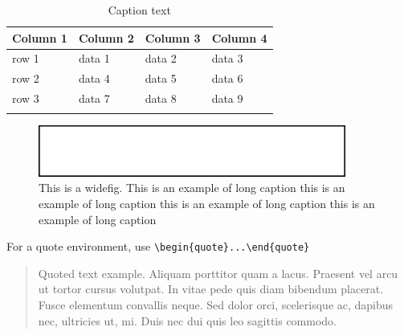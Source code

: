 \documentclass[sn-mathphys,Numbered]{sn-jnl}%
\theoremstyle{thmstyleone}%
\theoremstyle{thmstyletwo}%
\theoremstyle{thmstylethree}%
\begin{document}
\begin{table}[h]
\caption{Caption text}\label{tab1}%
\begin{tabular}{@{}llll@{}}
\toprule
Column 1 & Column 2  & Column 3 & Column 4\\
\midrule
row 1    & data 1   & data 2  & data 3  \\
row 2    & data 4   & data 5\footnotemark[1]  & data 6  \\
row 3    & data 7   & data 8  & data 9\footnotemark[2]  \\
\botrule
\end{tabular}
\end{table}


\begin{figure}[h]%
\centering
\includegraphics[width=0.9\textwidth]{fig.eps}
\caption{This is a widefig. This is an example of long caption this is an example of long caption  this is an example of long caption this is an example of long caption}\label{fig1}
\end{figure}

For a quote environment, use \verb+\begin{quote}...\end{quote}+
\begin{quote}
Quoted text example. Aliquam porttitor quam a lacus. Praesent vel arcu ut tortor cursus volutpat. In vitae pede quis diam bibendum placerat. Fusce elementum
convallis neque. Sed dolor orci, scelerisque ac, dapibus nec, ultricies ut, mi. Duis nec dui quis leo sagittis commodo.
\end{quote}


\printbibliography
\end{document}
